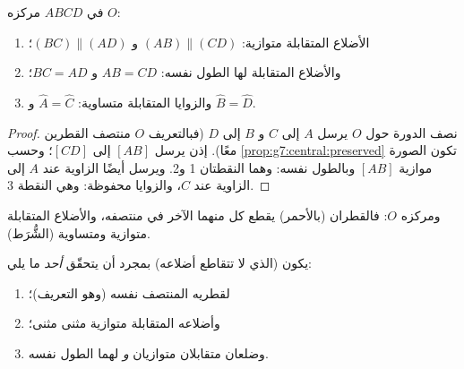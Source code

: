 \begin{theorem}\label{thm:g7:central:properties}
في  $ABCD$ مركزه $O$:
\begin{enumerate}
  \item الأضلاع المتقابلة متوازية: $(AB) \parallel (CD)$ و
        $(BC) \parallel (AD)$؛
  \item والأضلاع المتقابلة لها الطول نفسه: $AB = CD$ و
        $BC = AD$؛
  \item والزوايا المتقابلة متساوية: $\widehat A = \widehat C$ و
        $\widehat B = \widehat D$.
\end{enumerate}
\end{theorem}

\begin{proof}
نصف الدورة حول $O$ يرسل $A$ إلى $C$ و $B$ إلى $D$ (فبالتعريف
$O$ منتصف القطرين معًا). إذن يرسل 
$[AB]$ إلى  $[CD]$؛ وحسب
\cref{prop:g7:central:preserved} تكون الصورة موازية  $[AB]$
وبالطول نفسه: وهما النقطتان 1 و2. ويرسل أيضًا الزاوية عند $A$
إلى الزاوية عند $C$، والزوايا محفوظة: وهي النقطة 3.
\end{proof}

\begin{omfigure}

{\small {} ومركزه $O$: فالقطران (بالأحمر) يقطع
كل منهما الآخر في منتصفه، والأضلاع المتقابلة متوازية ومتساوية
(الشُّرَط).}
\end{omfigure}

\begin{theorem}\label{thm:g7:central:recognize}
يكون  (الذي لا تتقاطع أضلاعه)  بمجرد أن
يتحقّق \emph{أحد} ما يلي:
\begin{enumerate}
  \item لقطريه المنتصف نفسه (وهو التعريف)؛
  \item وأضلاعه المتقابلة متوازية مثنى مثنى؛
  \item وضلعان متقابلان متوازيان \emph{و} لهما الطول نفسه.
\end{enumerate}
\end{theorem}
\admitted

